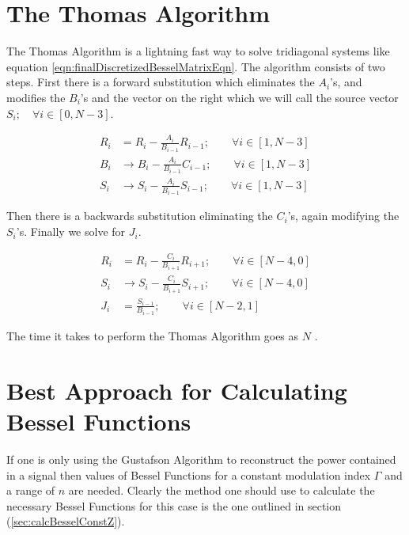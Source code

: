 \documentclass[onecolumn, groupedaddress, 10pt]{revtex4-1}
\begin{document}
\section{The Thomas Algorithm}
The Thomas Algorithm is a lightning fast way to solve tridiagonal systems like equation \ref{eqn:finalDiscretizedBesselMatrixEqn}.  The algorithm consists of two steps.  First there is a forward substitution which eliminates the $A_i$'s, and modifies the $B_i$'s and the vector on the right which we will call the source vector $S_i; \quad \forall i \in [0, N-3]$.

\begin{align}
R_i &=   R_i - \frac{A_i}{B_{i-1}} R_{i-1}; 	\qquad \forall i \in [1, N-3]		\\
B_i &\to B_i - \frac{A_i}{B_{i-1}} C_{i-1}; 	\qquad \forall i \in [1, N-3]		\\
S_i &\to S_i - \frac{A_i}{B_{i-1}} S_{i-1}; 	\qquad \forall i \in [1, N-3]
\end{align}

Then there is a backwards substitution eliminating the $C_i$'s, again modifying the $S_i$'s.  Finally we solve for $J_i$.

\begin{align}
R_i &=   R_i - \frac{C_i}{B_{i+1}} R_{i+1}; \qquad \forall i \in [N-4, 0]	\\
S_i &\to S_i - \frac{C_i}{B_{i+1}} S_{i+1}; \qquad \forall i \in [N-4, 0]	\\
J_i &=   \frac{S_{i-1}}{B_{i-1}};           \qquad \forall i \in [N-2, 1]
\end{align}

The time it takes to perform the Thomas Algorithm goes as $N$ \cite{}.




\section{Best Approach for Calculating Bessel Functions}
If one is only using the Gustafson Algorithm to reconstruct the power contained in a signal then values of Bessel Functions for a constant modulation index $\Gamma$ and a range of $n$ are needed.  Clearly the method one should use to calculate the necessary Bessel Functions for this case is the one outlined in section (\ref{sec:calcBesselConstZ}).
\end{document}
